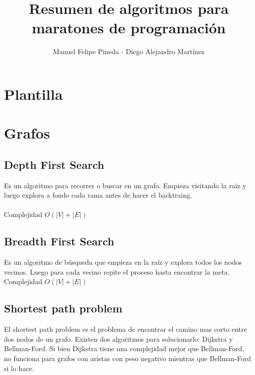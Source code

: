 \documentclass[10pt,letterpaper,twocolumn,twosided]{article}
\newcommand{\codigofuente}[1]{

\dotfill
}
\begin{document}
\title{Resumen de algoritmos para maratones de programación}
\author{Manuel Felipe Pineda - Diego Alejandro Martínez}
\maketitle

\tableofcontents
{}

\newpage

\section{Plantilla}
\codigofuente{../src/template.${EXT}}

\section{Grafos}

\subsection{Depth First Search}

Es un algoritmo para recorrer o buscar en un grafo. Empieza visitando la raiz y luego explora 
a fondo cada rama antes de hacer el backtraing.\\
\\
Complejidad $O(|V|+|E|)$

\codigofuente{../src/dfs.${EXT}}

\subsection{Breadth First Search}

Es un algoritmo de búsqueda que empieza en la raíz y explora todos los nodos vecinos. Luego para cada
vecino repite el proceso hasta encontrar la meta.\\
Complejidad $O(|V|+|E|)$

\codigofuente{../src/bfs.${EXT}}

\subsection{Shortest path problem}

El shortest path problem es el problema de encontrar el camino mas corto entre dos nodos de un grafo. Existen
dos algoritmos para solucionarlo: Dijkstra y Bellman-Ford. Si bien Dijkstra tiene una complejidad mejor que
Bellman-Ford, no funciona para grafos con aristas con peso negativo mientras que Bellman-Ford si lo hace.
\end{document}

